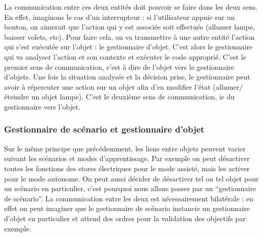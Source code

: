 La communication entre ces deux entités doit pouvoir se faire dans les deux sens.
En effet, imaginons le cas d'un interrupteur : si l'utilisateur appuie sur un bouton, on aimerait que l'action qui y est associée soit effectuée (allumer lampe, baisser volets, etc).
Pour faire cela, on va transmettre à une autre entité l'action qui s'est exécutée sur l'objet : le gestionnaire d'objet.
C'est alors le gestionnaire qui va analyser l'action et son contexte et exécuter le code approprié. C'est le premier sens de communication, c'est à dire de l'objet vers le gestionnaire d'objets.
Une fois la situation analysée et la décision prise, le gestionnaire peut avoir à répercuter une action sur un objet afin d'en modifier l'état (allumer/éteindre un objet lampe).
C'est le deuxième sens de communication, ie du gestionnaire vers l'objet.

\subsubsection{Gestionnaire de scénario et gestionnaire d'objet}

Sur le même principe que précédemment, les liens entre objets peuvent varier suivant les scénarios et modes d'apprentissage.
Par exemple on peut désactiver toutes les fonctions des stores électriques pour le mode assisté, mais les activer pour le mode autonome.
On peut aussi décider de désactiver tel ou tel objet pour un scénario en particulier, c'est pourquoi nous allons passer par un \enquote{gestionnaire de scénario}.
La communication entre les deux est nécessairement bilatérale : en effet on peut imaginer que le gestionnaire de scénario instancie un gestionnaire d'objet en particulier et attend des ordres pour la validation des objectifs par exemple.


